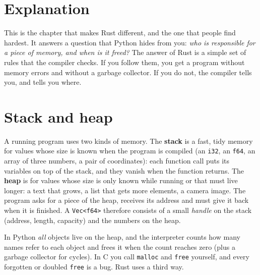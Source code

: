 \label{ch:rust3}

\section*{Explanation}
This is the chapter that makes Rust different, and the one that people find hardest. It answers a question that Python hides from you: \emph{who is responsible for a piece of memory, and when is it freed?} The answer of Rust is a simple set of rules that the compiler checks. If you follow them, you get a program without memory errors and without a garbage collector. If you do not, the compiler tells you, and tells you where.

\section*{Stack and heap}
A running program uses two kinds of memory. The \textbf{stack} is a fast, tidy memory for values whose size is known when the program is compiled (an \verb!i32!, an \verb!f64!, an array of three numbers, a pair of coordinates): each function call puts its variables on top of the stack, and they vanish when the function returns. The \textbf{heap} is for values whose size is only known while running or that must live longer: a text that grows, a list that gets more elements, a camera image. The program asks for a piece of the heap, receives its address and must give it back when it is finished. A \verb!Vec<f64>! therefore consists of a small \emph{handle} on the stack (address, length, capacity) and the numbers on the heap.
\begin{center}
\end{center}
In Python \emph{all} objects live on the heap, and the interpreter counts how many names refer to each object and frees it when the count reaches zero (plus a garbage collector for cycles). In C you call \verb!malloc! and \verb!free! yourself, and every forgotten or doubled \verb!free! is a bug. Rust uses a third way.

